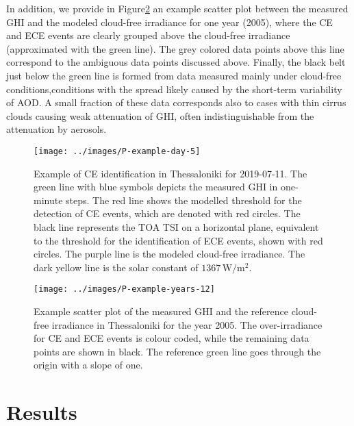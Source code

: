 \documentclass[preprint, 5p,
authoryear]{elsarticle} %
\begin{document}
In addition, we provide in Figure\nobreakspace{}\ref{fig:example-year}
an example scatter plot between the measured GHI and the modeled
cloud-free irradiance for one year (2005), where the CE and ECE events
are clearly grouped above the cloud-free irradiance (approximated with
the green line). The grey colored data points above this line correspond
to the ambiguous data points discussed above. Finally, the black belt
just below the green line is formed from data measured mainly under
cloud-free conditions,conditions with the spread likely caused by the
short-term variability of AOD. A small fraction of these data
corresponds also to cases with thin cirrus clouds causing weak
attenuation of GHI, often indistinguishable from the attenuation by
aerosols.

\begin{figure}[H]

{\centering \texttt{[image: ../images/P-example-day-5]} 

}

\caption{Example of CE identification in Thessaloniki for 2019-07-11. The green line with blue symbols depicts the measured GHI in one-minute steps. The red line shows the modelled threshold for the detection of CE events, which are denoted with red circles. The black line represents the TOA TSI on a horizontal plane, equivalent to the threshold for the identification of ECE events, shown with red circles. The purple line is the modeled cloud-free irradiance. The dark yellow line is the solar constant of $1367\,\text{W}/\text{m}^{2}$.}\label{fig:example-day}
\end{figure}

\begin{figure}[H]

{\centering \texttt{[image: ../images/P-example-years-12]} 

}

\caption{Example scatter plot of the measured GHI and the reference cloud-free irradiance in Thessaloniki for the year 2005. The over-irradiance for CE and ECE events is colour coded, while the remaining data points are shown in black. The reference green line goes through the origin with a slope of one.}\label{fig:example-year}
\end{figure}

\hypertarget{results}{%
\section{Results}\label{results}}
\end{document}
